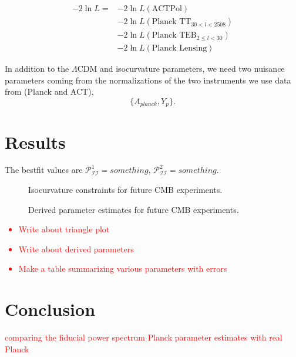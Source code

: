 \documentclass{emulateapj}
\newcommand\writingnote[1]{\textcolor{red}{#1}}
\newcommand\pii{ \mathcal{P}_{\mathcal{I}\mathcal{I}} }
\begin{document}
\begin{align}
-2 \ln L = &- 2 \ln L(\text{ACTPol}) \\
&-2 \ln L(\text{Planck TT}_{30 < l < 2508}) \\
&-2 \ln L(\text{Planck TEB}_{2 \leq l < 30})\\
&-2 \ln L(\text{Planck Lensing})
\end{align}

In addition to the $\Lambda$CDM and isocurvature parameters, we need two nuisance parameters coming from the normalizations of the two instruments we use data from (Planck and ACT),
\begin{equation}
\{ A_{planck}, Y_p \}.
\end{equation}



\section{Results}

The bestfit values are $\pii^1 = something$, $\pii^2 = something$.

\begin{figure}
\caption{Isocurvature constraints for future CMB experiments.\label{fig:triangleplots}}
\end{figure}



\begin{figure}
\caption{Derived parameter estimates for future CMB experiments.\label{fig:derivedparams}}
\end{figure}

\writingnote{
    \begin{itemize}
        \item Write about triangle plot
        \item Write about derived parameters
        \item Make a table summarizing various parameters with errors
    \end{itemize}
}

\section{Conclusion}

\appendix

\writingnote{comparing the fiducial power spectrum Planck parameter estimates with real Planck}


\end{document}
